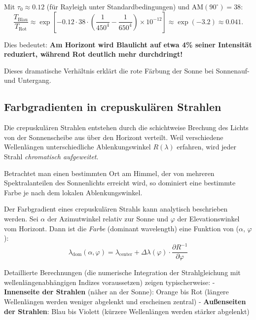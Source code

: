 \documentclass[12pt,a4paper]{article}
\begin{document}
Mit $\tau_0 \approx 0.12$ (für Rayleigh unter Standardbedingungen) und
$\mathrm{AM}(90^\circ) = 38$:
\begin{equation}
	\frac{T_{\mathrm{Blau}}}{T_{\mathrm{Rot}}} \approx \exp\left[-0.12 \cdot 38 \cdot 
	\left(\frac{1}{450^4} - \frac{1}{650^4}\right) \times 10^{-12}\right]
	\approx \exp(-3.2) \approx \boxed{0.041}.
	\label{eq:T_ratio_horz}
\end{equation}

Dies bedeutet: \textbf{Am Horizont wird Blaulicht auf etwa 4\% seiner Intensität
reduziert, während Rot deutlich mehr durchdringt!}

Dieses dramatische Verhältnis erklärt die rote Färbung der Sonne bei
Sonnenauf- und Untergang.

\subsection{Farbgradienten in crepuskulären Strahlen}
\label{subsec:crepuscular_colors}

Die crepuskulären Strahlen entstehen durch die schichtweise Brechung
des Lichts von der Sonnenscheibe aus über den Horizont verteilt.
Weil verschiedene Wellenlängen unterschiedliche Ablenkungswinkel $R(\lambda)$
erfahren, wird jeder Strahl \emph{chromatisch aufgeweitet}.

Betrachtet man einen bestimmten Ort am Himmel, der von mehreren
Spektralanteilen des Sonnenlichts erreicht wird, so dominiert eine bestimmte
Farbe je nach dem lokalen Ablenkungswinkel.

Der Farbgradient eines crepuskulären Strahls kann analytisch beschrieben werden.
Sei $\alpha$ der Azimutwinkel relativ zur Sonne und $\varphi$ der
Elevationswinkel vom Horizont. Dann ist die \emph{Farbe} (dominant wavelength)
eine Funktion von ($\alpha$, $\varphi$):
\begin{equation}
	\lambda_{\mathrm{dom}}(\alpha, \varphi) = \lambda_{\mathrm{center}} 
	+ \Delta \lambda(\varphi) \cdot \frac{\partial R^{-1}}{\partial \varphi}
	\label{eq:lambda_dom}
\end{equation}

Detaillierte Berechnungen (die numerische Integration der Strahlgleichung
mit wellenlängenabhängigen Indizes voraussetzen) zeigen typischerweise:
- \textbf{Innenseite der Strahlen} (näher an der Sonne): Orange bis Rot
  (längere Wellenlängen werden weniger abgelenkt und erscheinen zentral)
- \textbf{Außenseiten der Strahlen}: Blau bis Violett
  (kürzere Wellenlängen werden stärker abgelenkt)
\end{document}
